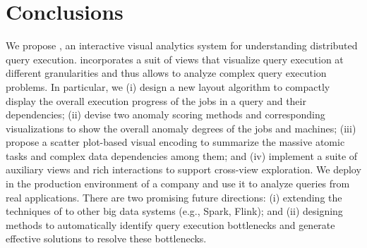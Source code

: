\section{Conclusions}\label{sec:con}
We propose \qevis{}, an interactive visual analytics system for understanding distributed query execution. \qevis{} incorporates a suit of views that visualize query execution at different granularities and thus allows to analyze complex query execution problems. In particular, we (i) design a new layout algorithm to compactly display the overall execution progress of the jobs in a query and their dependencies; (ii) devise two anomaly scoring methods and corresponding visualizations to show the overall anomaly degrees of the jobs and machines; (iii) propose a scatter plot-based visual encoding to summarize the massive atomic tasks and complex data dependencies among them; and (iv) implement a suite of auxiliary views and rich interactions to support cross-view exploration.
We deploy \qevis{} in the production environment of a company and use it to analyze queries from real applications.
There are two promising future directions: (i) extending the techniques of \qevis{} to other big data systems (e.g., Spark, Flink); and (ii) designing methods to automatically identify query execution bottlenecks and generate effective solutions to resolve these bottlenecks. 
